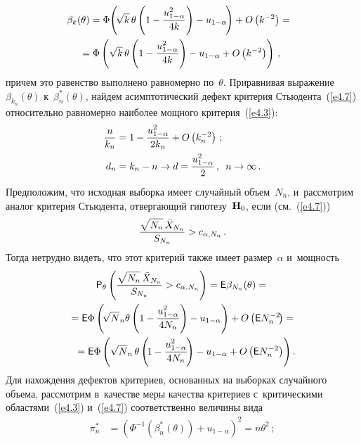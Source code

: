 \begin{multicols}{2}
\noindent
\begin{multline*}
\hspace*{-2mm}\beta_k(\theta) = \Phi\!\left(\!\sqrt {k}\, \theta \left(1 - 
\fr{u_{1-\alpha}^2}{4k}\right) - u_{1-\alpha}\!\right) +
 O\left(k^{-2}\right) ={}
\\
\hspace*{-3mm}{}= \Phi\left(\sqrt {k}\, \theta \left(1 - \fr{u_{1-\alpha}^2}{4k}\right) 
- u_{1-\alpha} +  O\left(k^{-2}\right)\right)\,,\!\!
\end{multline*}
причем это равенство выполнено равномерно по~$\theta$. Приравнивая 
выражение~$\beta_{k_n}(\theta)$ к~$\beta^*_n(\theta)$, 
найдем асимптотический дефект критерия Стьюдента~(\ref{e4.7}) 
относительно равномерно наиболее мощного критерия~(\ref{e4.3}):
\begin{align*}
\displaystyle\frac{\displaystyle n\mathstrut}{\displaystyle k_n\mathstrut} &= 1 - \displaystyle\frac{\displaystyle u_{1-\alpha}^2\mathstrut}{\displaystyle 2k_n\mathstrut} +  O\left(k_n^{-2}\right)\,;\\
d_n &= k_n - n \to d = \displaystyle\frac{\displaystyle u_{1-\alpha}^2\mathstrut}{\displaystyle 2\mathstrut}\,,\enskip n \to \infty\,.
\end{align*}
Предположим, что исходная выборка имеет случайный объем~$N_n$, и~рассмотрим 
аналог критерия Стьюдента, отвергающий гипотезу~${\bf H}_0$, если (см.~(\ref{e4.7}))
\begin{equation}
\displaystyle\frac{\displaystyle \sqrt {N_n}\, \bar X_{N_n}\mathstrut}{\displaystyle S_{N_n}\mathstrut} > c_{\alpha,N_n}\,.
\label{e4.10}
\end{equation}
Тогда нетрудно видеть, что этот критерий также имеет размер~$\alpha$ и~мощность
\begin{multline*}
{\sf P}_\theta \left(\displaystyle\frac{\displaystyle \sqrt {N_n}\, \bar X_{N_n}\mathstrut}{\displaystyle S_{N_n}\mathstrut} > 
c_{\alpha,N_n}\right) = {\sf E} \beta_{N_n}(\theta) ={}
\\
{}= {\sf E} \Phi\left(\!\sqrt N_n \theta \left(1 - \displaystyle\frac{\displaystyle u_{1-\alpha}^2\mathstrut}{\displaystyle 4N_n\mathstrut}\right) - 
u_{1-\alpha}\right) +
 O\left({\sf E} N_n^{-2}\!\right)={}
\\
{}= {\sf E} \Phi\left(\sqrt N_n\, \theta \left(\!1 - \displaystyle\frac{\displaystyle u_{1-\alpha}^2\mathstrut}{\displaystyle 4N_n\mathstrut}\!\right) - 
u_{1-\alpha} + O\left({\sf E} N_n^{-2}\right)\right).\hspace*{-5.3pt}
\end{multline*}
Для нахождения дефектов критериев, основанных на выборках случайного 
объема, рассмотрим в~качестве меры качества критериев с~критическими 
областями~(\ref{e4.3}) и~(\ref{e4.7}) соответственно величины \mbox{вида}
\begin{align}
\pi_n^* &= \left(\Phi^{-1}\left(\beta_n^*(\theta)\right) + u_{1-\alpha}\right)^2 =
n \theta^2\,; \label{e4.12}

\end{align}
\end{multicols}
